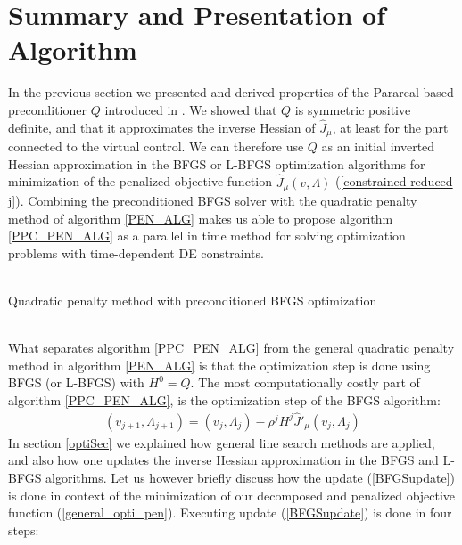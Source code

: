 \section{Summary and Presentation of Algorithm} \label{Algorithm_sec}
In the previous section we presented and derived properties of the Parareal-based preconditioner $Q$ introduced in \cite{maday2002parareal}. We showed that $Q$ is symmetric positive definite, and that it approximates the inverse Hessian of $\hat J_{\mu}$, at least for the part connected to the virtual control. We can therefore use $Q$ as an initial inverted Hessian approximation in the BFGS or L-BFGS optimization algorithms for minimization of the penalized objective function $\hat J_{\mu}(v,\Lambda)$ (\ref{constrained reduced j}). Combining the preconditioned BFGS solver with the quadratic penalty method of algorithm \ref{PEN_ALG} makes us able to propose algorithm \ref{PPC_PEN_ALG} as a parallel in time method for solving optimization problems with time-dependent DE constraints.
\\
\\
\begin{algorithm}[H] 
\caption{Quadratic penalty method with preconditioned BFGS optimization\label{PPC_PEN_ALG}}
\end{algorithm}
\noindent
\\
What separates algorithm \ref{PPC_PEN_ALG} from the general quadratic penalty method in algorithm \ref{PEN_ALG} is that the optimization step is done using BFGS (or L-BFGS) with $H^0=Q$. The most computationally costly part of algorithm \ref{PPC_PEN_ALG}, is the optimization step of the BFGS algorithm:
\begin{align}
(v_{j+1},\Lambda_{j+1}) = (v_j,\Lambda_j) - \rho^j H^j \hat J'_{\mu}(v_j,\Lambda_j) \label{BFGSupdate}
\end{align}
In section \ref{optiSec} we explained how general line search methods are applied, and also how one updates the inverse Hessian approximation in the BFGS and L-BFGS algorithms. Let us however briefly discuss how the update (\ref{BFGSupdate}) is done in context of the  minimization of our decomposed and penalized objective function (\ref{general_opti_pen}). Executing update (\ref{BFGSupdate}) is done in four steps:
